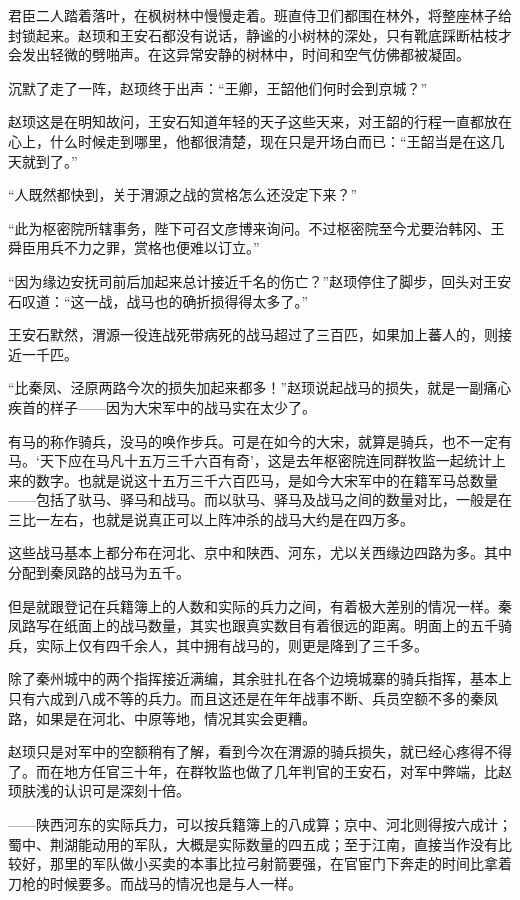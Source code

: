 君臣二人踏着落叶，在枫树林中慢慢走着。班直侍卫们都围在林外，将整座林子给封锁起来。赵顼和王安石都没有说话，静谧的小树林的深处，只有靴底踩断枯枝才会发出轻微的劈啪声。在这异常安静的树林中，时间和空气仿佛都被凝固。

沉默了走了一阵，赵顼终于出声：“王卿，王韶他们何时会到京城？”

赵顼这是在明知故问，王安石知道年轻的天子这些天来，对王韶的行程一直都放在心上，什么时候走到哪里，他都很清楚，现在只是开场白而已：“王韶当是在这几天就到了。”

“人既然都快到，关于渭源之战的赏格怎么还没定下来？”

“此为枢密院所辖事务，陛下可召文彦博来询问。不过枢密院至今尤要治韩冈、王舜臣用兵不力之罪，赏格也便难以订立。”

“因为缘边安抚司前后加起来总计接近千名的伤亡？”赵顼停住了脚步，回头对王安石叹道：“这一战，战马也的确折损得得太多了。”

王安石默然，渭源一役连战死带病死的战马超过了三百匹，如果加上蕃人的，则接近一千匹。

“比秦凤、泾原两路今次的损失加起来都多！”赵顼说起战马的损失，就是一副痛心疾首的样子——因为大宋军中的战马实在太少了。

有马的称作骑兵，没马的唤作步兵。可是在如今的大宋，就算是骑兵，也不一定有马。‘天下应在马凡十五万三千六百有奇’，这是去年枢密院连同群牧监一起统计上来的数字。也就是说这十五万三千六百匹马，是如今大宋军中的在籍军马总数量——包括了驮马、驿马和战马。而以驮马、驿马及战马之间的数量对比，一般是在三比一左右，也就是说真正可以上阵冲杀的战马大约是在四万多。

这些战马基本上都分布在河北、京中和陕西、河东，尤以关西缘边四路为多。其中分配到秦凤路的战马为五千。

但是就跟登记在兵籍簿上的人数和实际的兵力之间，有着极大差别的情况一样。秦凤路写在纸面上的战马数量，其实也跟真实数目有着很远的距离。明面上的五千骑兵，实际上仅有四千余人，其中拥有战马的，则更是降到了三千多。

除了秦州城中的两个指挥接近满编，其余驻扎在各个边境城寨的骑兵指挥，基本上只有六成到八成不等的兵力。而且这还是在年年战事不断、兵员空额不多的秦凤路，如果是在河北、中原等地，情况其实会更糟。

赵顼只是对军中的空额稍有了解，看到今次在渭源的骑兵损失，就已经心疼得不得了。而在地方任官三十年，在群牧监也做了几年判官的王安石，对军中弊端，比赵顼肤浅的认识可是深刻十倍。

——陕西河东的实际兵力，可以按兵籍簿上的八成算；京中、河北则得按六成计；蜀中、荆湖能动用的军队，大概是实际数量的四五成；至于江南，直接当作没有比较好，那里的军队做小买卖的本事比拉弓射箭要强，在官宦门下奔走的时间比拿着刀枪的时候要多。而战马的情况也是与人一样。

